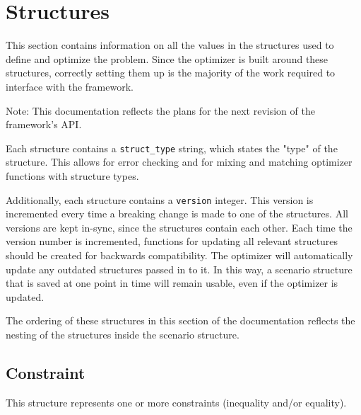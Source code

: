 \documentclass{article}
\begin{document}
	\section{Structures}
		This section contains information on all the values in the structures used to define and optimize the problem.
		Since the optimizer is built around these structures, correctly setting them up is the majority of the work required to
		interface with the framework.

		Note: This documentation reflects the plans for the next revision of the framework's API.

		Each structure contains a \lstinline|struct_type| string, which states the "type" of the structure.
		This allows for error checking and for mixing and matching optimizer functions with structure types.

		Additionally, each structure contains a \lstinline|version| integer. This version is incremented every time a breaking
		change is made to one of the structures. All versions are kept in-sync, since the structures contain each other.
		Each time the version number is incremented, functions for updating all relevant structures should be created for backwards
		compatibility. The optimizer will automatically update any outdated structures passed in to it. In this way, a scenario structure
		that is saved at one point in time will remain usable, even if the optimizer is updated.

		The ordering of these structures in this section of the documentation reflects
		the nesting of the structures inside the scenario structure.

		\subsection{Constraint}
			\label{sec:constraint} %

			This structure represents one or more constraints (inequality and/or equality).

			\vspace{\baselineskip}
\end{document}
